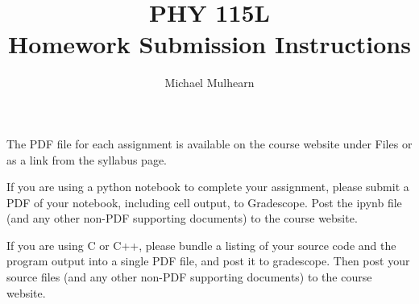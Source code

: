 \documentclass[12pt]{article}
\begin{document}
\title{PHY 115L \\ Homework Submission Instructions }
\author{Michael Mulhearn}

\maketitle

The PDF file for each assignment is available on the course website under Files or as a link from the syllabus page.

If you are using a python notebook to complete your assignment, please
submit a PDF of your notebook, including cell output, to Gradescope.  Post the
ipynb file (and any other non-PDF supporting documents) to the course
website.

If you are using C or C++, please bundle a listing of your source code and the program output into a single PDF file, and post it to gradescope.  Then post your source files (and any other non-PDF supporting documents) to the course
website.
\end{document}
